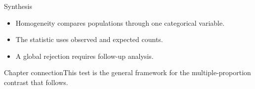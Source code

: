 \documentclass[10pt,aspectratio=169]{beamer}
\begin{document}
\begin{frame}{Synthesis}\small\begin{itemize}\item Homogeneity compares populations through one categorical variable.\item The statistic uses observed and expected counts.\item A global rejection requires follow-up analysis.\end{itemize}\end{frame}
\begin{frame}{Chapter connection}\small This test is the general framework for the multiple-proportion contrast that follows.\end{frame}
\end{document}
